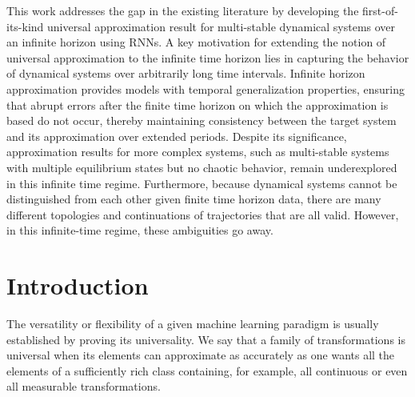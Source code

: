 \documentclass{article}
\newcounter{ct}
\begin{document}
This work addresses the gap in the existing literature by developing the first-of-its-kind universal approximation result for multi-stable dynamical systems over an infinite horizon using RNNs. A key motivation for extending the notion of universal approximation to the infinite time horizon lies in capturing the behavior of dynamical systems over arbitrarily long time intervals. Infinite horizon approximation provides models with temporal generalization properties, ensuring that abrupt errors after the finite time horizon on which the approximation is based do not occur, thereby maintaining consistency between the target system and its approximation over extended periods. Despite its significance, approximation results for more complex systems, such as multi-stable systems with multiple equilibrium states but no chaotic behavior, remain underexplored in this infinite time regime. Furthermore, because dynamical systems cannot be distinguished from each other given finite time horizon data, there are many different topologies and continuations of trajectories that are all valid. However, in this infinite-time regime, these ambiguities go away.




\section{Introduction}
The versatility or flexibility of a given machine learning paradigm is usually established by proving its universality.
We say that a family of transformations is universal when its elements can approximate as accurately as one wants all the elements of a sufficiently rich class containing, for example, all continuous or even all measurable transformations.
\end{document}
